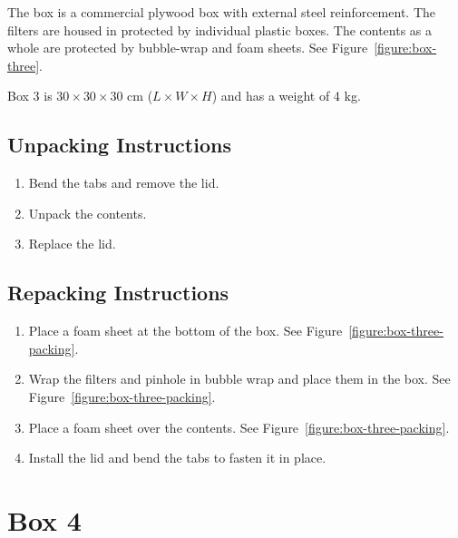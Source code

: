 \documentclass{article}
\begin{document}
The box is a commercial plywood box with external steel reinforcement. The filters are housed in protected by individual plastic boxes. The contents as a whole are protected by bubble-wrap and foam sheets. See Figure~\ref{figure:box-three}.

Box 3 is $30 \times 30 \times 30$ cm ($L \times W \times H$) and has a weight of 4 kg.

\subsection{Unpacking Instructions}

\begin{enumerate}
\item Bend the tabs and remove the lid.
\item Unpack the contents.
\item Replace the lid.
\end{enumerate}

\subsection{Repacking Instructions}

\begin{enumerate}
\item Place a foam sheet at the bottom of the box. See Figure~\ref{figure:box-three-packing}.
\item Wrap the filters and pinhole in bubble wrap and place them in the box.  See Figure~\ref{figure:box-three-packing}.
\item Place a foam sheet over the contents.  See Figure~\ref{figure:box-three-packing}.
\item Install the lid and bend the tabs to fasten it in place.
\end{enumerate}


\clearpage
\section{Box 4}
\end{document}
